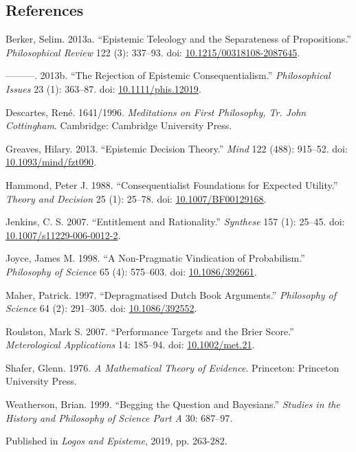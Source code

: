 \documentclass[
  10pt,
  letterpaper,
  DIV=11,
  numbers=noendperiod,
  twoside]{scrartcl}
\newlength{\cslhangindent}
\newenvironment{CSLReferences}[2] %
 {\begin{list}{}{%
  \setlength{\itemindent}{0pt}
  \setlength{\leftmargin}{0pt}
  \setlength{\parsep}{0pt}
  \ifodd #1
   \setlength{\leftmargin}{\cslhangindent}
   \setlength{\itemindent}{-1\cslhangindent}
  \fi
  \setlength{\itemsep}{#2\baselineskip}}}
 {\end{list}}
\begin{document}
\subsection*{References}\label{references}

\label{refs}
\begin{CSLReferences}{1}{0}
Berker, Selim. 2013a. {``Epistemic Teleology and the Separateness of
Propositions.''} \emph{Philosophical Review} 122 (3): 337--93. doi:
\href{https://doi.org/10.1215/00318108-2087645}{10.1215/00318108-2087645}.

---------. 2013b. {``The Rejection of Epistemic Consequentialism.''}
\emph{Philosophical Issues} 23 (1): 363--87. doi:
\href{https://doi.org/10.1111/phis.12019}{10.1111/phis.12019}.

Descartes, René. 1641/1996. \emph{Meditations on First Philosophy, {Tr.
John Cottingham}}. Cambridge: Cambridge University Press.

Greaves, Hilary. 2013. {``Epistemic Decision Theory.''} \emph{Mind} 122
(488): 915--52. doi:
\href{https://doi.org/10.1093/mind/fzt090}{10.1093/mind/fzt090}.

Hammond, Peter J. 1988. {``Consequentialist Foundations for Expected
Utility.''} \emph{Theory and Decision} 25 (1): 25--78. doi:
\href{https://doi.org/10.1007/BF00129168}{10.1007/BF00129168}.

Jenkins, C. S. 2007. {``Entitlement and Rationality.''} \emph{Synthese}
157 (1): 25--45. doi:
\href{https://doi.org/10.1007/s11229-006-0012-2}{10.1007/s11229-006-0012-2}.

Joyce, James M. 1998. {``A Non-Pragmatic Vindication of Probabilism.''}
\emph{Philosophy of Science} 65 (4): 575--603. doi:
\href{https://doi.org/10.1086/392661}{10.1086/392661}.

Maher, Patrick. 1997. {``Depragmatised Dutch Book Arguments.''}
\emph{Philosophy of Science} 64 (2): 291--305. doi:
\href{https://doi.org/10.1086/392552}{10.1086/392552}.

Roulston, Mark S. 2007. {``Performance Targets and the Brier Score.''}
\emph{Meterological Applications} 14: 185--94. doi:
\href{https://doi.org/10.1002/met.21}{10.1002/met.21}.

Shafer, Glenn. 1976. \emph{A Mathematical Theory of Evidence}.
Princeton: Princeton University Press.

Weatherson, Brian. 1999. {``Begging the Question and Bayesians.''}
\emph{Studies in the History and Philosophy of Science Part A} 30:
687--97.

\end{CSLReferences}



\noindent Published in\emph{
Logos and Episteme}, 2019, pp. 263-282.
\end{document}
